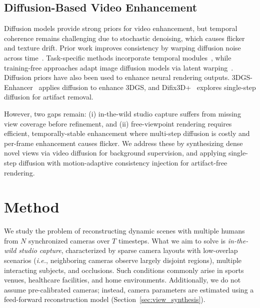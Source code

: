 \documentclass[acmtog]{acmart}
\newcommand{\ie}{\textit{i.e.}}
\begin{document}
\subsection{Diffusion-Based Video Enhancement}
Diffusion models provide strong priors for video enhancement, but temporal coherence remains challenging due to stochastic denoising, which causes flicker and texture drift. Prior work improves consistency by warping diffusion noise across time~\cite{chang2025warped,daras2024warped}.
Task-specific methods incorporate temporal modules~\cite{zhou2024upscale,yang2024motion}, while training-free approaches adapt image diffusion models via latent warping~\cite{yeh2024diffir2vr}.
Diffusion priors have also been used to enhance neural rendering outputs.
3DGS-Enhancer~\cite{liu20243dgs} applies diffusion to enhance 3DGS, and Difix3D+~\cite{wu2025difix3d+} explores single-step diffusion for artifact removal.

However, two gaps remain: (i) in-the-wild studio capture suffers from missing view coverage before refinement, and (ii) free-viewpoint rendering requires efficient, temporally-stable enhancement where multi-step diffusion is costly and per-frame enhancement causes flicker.
We address these by synthesizing dense novel views via video diffusion for background supervision, and applying single-step diffusion with motion-adaptive consistency injection for artifact-free rendering.

\section{Method}
\label{sec:method}

We study the problem of reconstructing dynamic scenes with multiple humans from $N$ synchronized cameras over $T$ timesteps.
What we aim to solve is \emph{in-the-wild studio capture}, characterized by sparse camera layouts with low-overlap scenarios (\ie, neighboring cameras observe largely disjoint regions), multiple interacting subjects, and occlusions.
Such conditions commonly arise in sports venues, healthcare facilities, and home environments.
Additionally, we do not assume pre-calibrated cameras; instead, camera parameters are estimated using a feed-forward reconstruction model (Section~\ref{sec:view_synthesis}).
\end{document}
